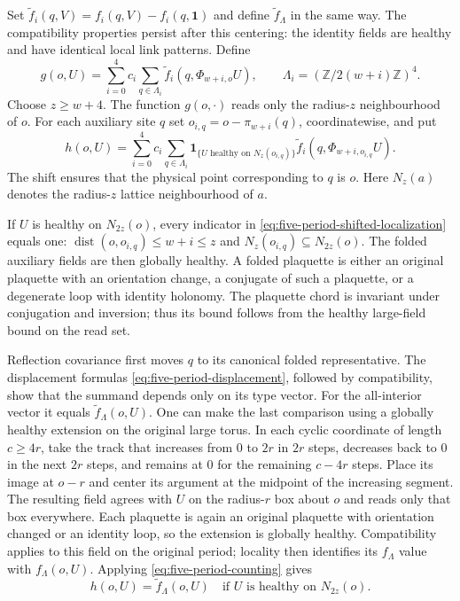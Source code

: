 Set $\widetilde f_i(q,V)=f_i(q,V)-f_i(q,\mathbf1)$ and define
$\widetilde f_\Lambda$ in the same way. The compatibility properties
persist after this centering: the identity fields are healthy and
have identical local link patterns. Define
\[
 g(o,U)=\sum_{i=0}^4c_i\sum_{q\in\Lambda_i}
                         \widetilde f_i(q,\Phi_{w+i,o}U),
                   \qquad \Lambda_i=(\mathbb Z/2(w+i)\mathbb Z)^4.
\]
Choose $z\ge w+4$. The function $g(o,\cdot)$ reads only the
radius-$z$ neighbourhood of $o$. For each auxiliary site $q$ set
$o_{i,q}=o-\pi_{w+i}(q)$, coordinatewise, and put
\begin{equation}\label{eq:five-period-shifted-localization}
 h(o,U)=\sum_{i=0}^4c_i\sum_{q\in\Lambda_i}
  \mathbf1_{\{U\text{ healthy on }N_z(o_{i,q})\}}
                  \widetilde f_i(q,\Phi_{w+i,o_{i,q}}U).
\end{equation}
The shift ensures that the physical point corresponding to $q$
is $o$. Here $N_z(a)$ denotes the radius-$z$ lattice neighbourhood
of $a$.

If $U$ is healthy on $N_{2z}(o)$, every indicator in
\eqref{eq:five-period-shifted-localization} equals one:
$\operatorname{dist}(o,o_{i,q})\le w+i\le z$ and
$N_z(o_{i,q})\subseteq N_{2z}(o)$. The folded auxiliary fields
are then globally healthy. A folded plaquette is either an
original plaquette with an orientation change, a conjugate of
such a plaquette, or a degenerate loop with identity holonomy.
The plaquette chord is invariant under conjugation and inversion;
thus its bound follows from the healthy large-field bound on the
read set.

Reflection covariance first moves $q$ to its canonical folded
representative. The displacement formulas
\eqref{eq:five-period-displacement}, followed by compatibility,
show that the summand depends only on its type vector. For the
all-interior vector it equals $\widetilde f_\Lambda(o,U)$. One can
make the last comparison using a globally healthy extension on the original large torus.
In each cyclic coordinate of length $c\ge4r$, take the track
that increases from $0$ to $2r$ in $2r$ steps, decreases back to
$0$ in the next $2r$ steps, and remains at $0$ for the remaining
$c-4r$ steps. Place its image at $o-r$ and center its argument at
the midpoint of the increasing segment. The resulting field agrees
with $U$ on the radius-$r$ box about $o$ and reads only that box
everywhere. Each plaquette is again an original plaquette with
orientation changed or an identity loop, so the extension is
globally healthy. Compatibility applies to this field on the
original period; locality then identifies its $f_\Lambda$ value with
$f_\Lambda(o,U)$. Applying \eqref{eq:five-period-counting} gives
\begin{equation}\label{eq:five-period-healthy-identity}
                h(o,U)=\widetilde f_\Lambda(o,U)
                          \quad\text{if $U$ is healthy on }N_{2z}(o).
\end{equation}

